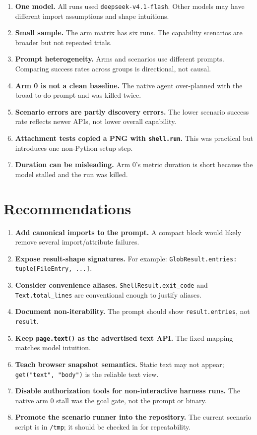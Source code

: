 \documentclass[11pt]{article}
\newcommand{\code}[1]{\texttt{#1}}
\begin{document}
\begin{enumerate}[leftmargin=1.5em]
\item \textbf{One model.}  All runs used \code{deepseek-v4.1-flash}.  Other
models may have different import assumptions and shape intuitions.
\item \textbf{Small sample.}  The arm matrix has six runs.  The capability
scenarios are broader but not repeated trials.
\item \textbf{Prompt heterogeneity.}  Arms and scenarios use different prompts.
Comparing success rates across groups is directional, not causal.
\item \textbf{Arm 0 is not a clean baseline.}  The native agent over-planned
with the broad to-do prompt and was killed twice.
\item \textbf{Scenario errors are partly discovery errors.}  The lower scenario
success rate reflects newer APIs, not lower overall capability.
\item \textbf{Attachment tests copied a PNG with \code{shell.run}.}  This was
practical but introduces one non-Python setup step.
\item \textbf{Duration can be misleading.}  Arm 0's metric duration is short
because the model stalled and the run was killed.
\end{enumerate}

\section{Recommendations}

\begin{enumerate}[leftmargin=1.5em]
\item \textbf{Add canonical imports to the prompt.}  A compact block would likely
remove several import/attribute failures.
\item \textbf{Expose result-shape signatures.}  For example:
\code{GlobResult.entries: tuple[FileEntry, ...]}.
\item \textbf{Consider convenience aliases.}  \code{ShellResult.exit\_code} and
\code{Text.total\_lines} are conventional enough to justify aliases.
\item \textbf{Document non-iterability.}  The prompt should show
\code{result.entries}, not \code{result}.
\item \textbf{Keep \code{page.text()} as the advertised text API.}  The fixed
mapping matches model intuition.
\item \textbf{Teach browser snapshot semantics.}  Static text may not appear;
\code{get("text", "body")} is the reliable text view.
\item \textbf{Disable authorization tools for non-interactive harness runs.}
The native arm 0 stall was the goal gate, not the prompt or binary.
\item \textbf{Promote the scenario runner into the repository.}  The current
scenario script is in \code{/tmp}; it should be checked in for repeatability.
\end{enumerate}
\end{document}
